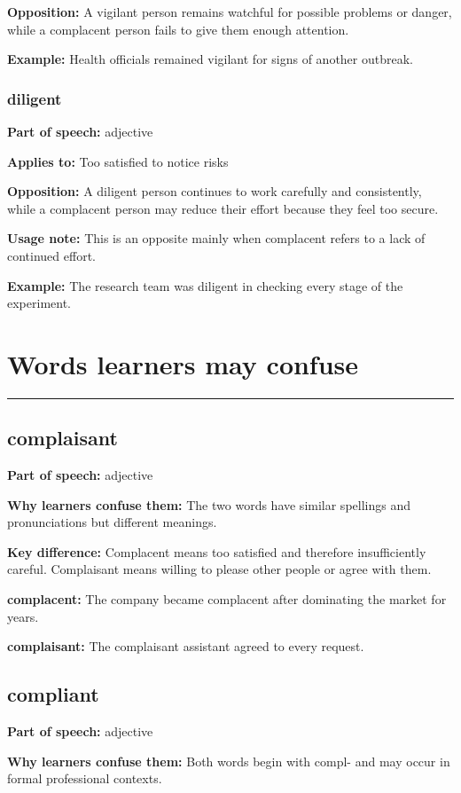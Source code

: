 \documentclass[11pt]{article}
\newcommand{\sectionrule}{\par\vspace{-0.5em}\noindent\textcolor{Accent}{\rule{\linewidth}{0.6pt}}\par}
\begin{document}
\textbf{Opposition:} A vigilant person remains watchful for possible problems or danger, while a complacent person fails to give them enough attention.

\textbf{Example:} Health officials remained vigilant for signs of another outbreak.

\subsubsection{diligent}
\textbf{Part of speech:} adjective

\textbf{Applies to:} Too satisfied to notice risks

\textbf{Opposition:} A diligent person continues to work carefully and consistently, while a complacent person may reduce their effort because they feel too secure.

\textbf{Usage note:} This is an opposite mainly when complacent refers to a lack of continued effort.

\textbf{Example:} The research team was diligent in checking every stage of the experiment.

\section{Words learners may confuse}
\sectionrule
\subsection{complaisant}
\textbf{Part of speech:} adjective

\textbf{Why learners confuse them:} The two words have similar spellings and pronunciations but different meanings.

\textbf{Key difference:} Complacent means too satisfied and therefore insufficiently careful. Complaisant means willing to please other people or agree with them.

\textbf{complacent:} The company became complacent after dominating the market for years.

\textbf{complaisant:} The complaisant assistant agreed to every request.

\subsection{compliant}
\textbf{Part of speech:} adjective

\textbf{Why learners confuse them:} Both words begin with compl- and may occur in formal professional contexts.
\end{document}
